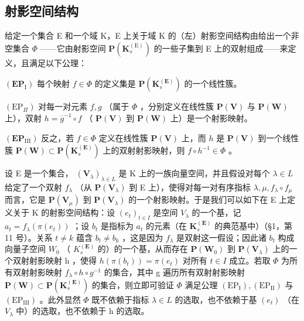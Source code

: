 \subsection{射影空间结构}

给定一个集合 E 和一个域 K，E 上关于域 K 的（左）射影空间结构由给出一个非空集合 \(\Phi\) ——它由射影空间 \(\mathbf{P}(\mathbf{K}_{s}^{\mathrm{(E)}})\) 的一些子集到 E 上的双射组成——来定义，且满足以下公理：

\((\mathbf{EP}_{\mathrm{I}})\) 每个映射 \(f \in \Phi\) 的定义集是 \(\mathbf{P}(\mathbf{K}_s^{(\mathbf{E})})\) 的一个线性簇。

\((\mathrm{EP}_{\Pi})\) 对每一对元素 \(f, g\) （属于 \(\Phi\) ，分别定义在线性簇 \(\mathbf{P}(\mathbf{V})\) 与 \(\mathbf{P}(\mathbf{W})\) 上），双射 \(h = \overline{g}^{-1} \circ f\) （ \(\mathbf{P}(\mathbf{V})\) 到 \(\mathbf{P}(\mathbf{W})\) 上）是一个射影映射。

\((\mathbf{EP}_{\mathrm{III}})\) 反之，若 \(f \in \Phi\) 定义在线性簇 \(\mathbf{P}(\mathbf{V})\) 上，而 \(h\) 是 \(\mathbf{P}(\mathbf{V})\) 到一个线性簇 \(\mathbf{P}(\mathbf{W}) \subset \mathbf{P}(\mathbf{K}_s^{\mathbf{(E)}})\) 上的双射射影映射，则 \(f \circ h^{-1} \in \Phi\) 。

设 E 是一个集合， \((\mathbf{V}_{\lambda})_{\lambda \in L}\) 是 K 上的一族向量空间，并且假设对每个 \(\lambda \in L\) 给定了一个双射 \(f_{\lambda}\) （从 \(\mathbf{P}(\mathbf{V}_{\lambda})\) 到 E 上），使得对每一对有序指标 \(\lambda, \mu, f_{\lambda} \circ f_{\mu}\) 而言，它是 \(\mathbf{P}(\mathbf{V}_{\mu})\) 到 \(\mathbf{P}(\mathbf{V}_{\lambda})\) 的一个射影映射。于是我们可以如下在 E 上定义关于 K 的射影空间结构：设 \((e_{t})_{t \in I}\) 是空间 \(V_{\lambda}\) 的一个基，记 \(a_{t} = f_{\lambda}(\pi(e_{t}))\) ；设 \(b_{t}\) 是指标为 \(a_{t}\) 的元素（在 \(\mathbf{K}_{s}^{(\mathbf{E})}\) 的典范基中）（§1，第 11 号）。关系 \(t \neq k\) 蕴含 \(b_{t} \neq b_{k}\) ，这是因为 \(f_{\lambda}\) 是双射这一假设；因此诸 \(b_{t}\) 构成向量子空间 \(W_{0}\) （ \(K_{s}^{(\mathbf{E})}\) 的）的一个基，从而存在 \(\mathbf{P}(\mathbf{W}_{0})\) 到 \(\mathbf{P}(\mathbf{V}_{\lambda})\) 上的一个双射射影映射 h ，使得 \(h(\pi(b_{t})) = \pi(e_{t})\) 对所有 \(t \in I\) 成立。若取 \(\Phi\) 为所有双射射影映射 \(f_{\lambda} \circ h \circ g^{-1}\) 的集合，其中 g 遍历所有双射射影映射 \(\mathbf{P}(\mathbf{W}) \subset \mathbf{P}(\mathbf{K}_{s}^{(\mathbf{E})})\) 的集合，则立即可验证 \(\Phi\) 满足公理 \((\mathrm{EP}_{\mathrm{I}}), (\mathrm{EP}_{\mathrm{II}})\) 与 \((\mathrm{EP}_{\mathrm{III}})\) 。此外显然 \(\Phi\) 既不依赖于指标 \(\lambda \in L\) 的选取，也不依赖于基 \((e_{t})\) （在 \(V_{\lambda}\) 中）的选取，也不依赖于 h 的选取。

